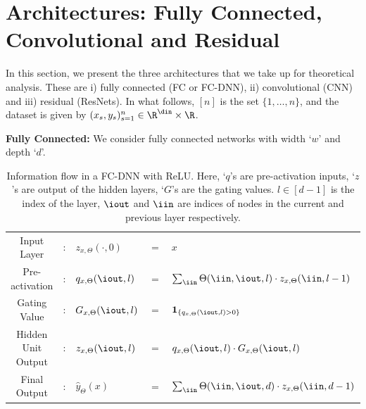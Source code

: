 \section{Architectures: Fully Connected, Convolutional and Residual}\label{sec:arch}
In this section, we present the three architectures that we take up for theoretical analysis. These are i) fully connected (FC or FC-DNN), ii) convolutional (CNN) and iii) residual (ResNets). In what follows, $[n]$ is the set $\{1,\ldots,n\}$, and the dataset is given by $(x_s,y_s)_{s=1}^n\in\R^{\din}\times \R$.

\textbf{Fully Connected:} We consider fully connected networks with width `$w$' and depth `$d$'.
 \FloatBarrier
\begin{table}[h]
\centering
\begin{tabular}{|c l lll|}\hline
Input Layer&: &$z_{x,\Theta}(\cdot,0)$ &$=$ &$x$ \\
Pre-activation&: & $q_{x,\Theta}(\iout,l)$& $=$ & $\sum_{\iin}\Theta(\iin,\iout,l) \cdot z_{x,\Theta}(\iin,l-1) $\\
Gating Value&: &$G_{x,\Theta}(\iout,l)$& $=$ & $\mathbf{1}_{\{q_{x,\Theta}(\iout,l)>0\}}$\\
Hidden Unit Output&: &$z_{x,\Theta}(\iout,l)$ & $=$ & $q_{x,\Theta}(\iout,l)\cdot G_{x,\Theta}(\iout,l)$\\
Final Output&: & $\hat{y}_{\Theta}(x)$ & $=$ & $\sum_{\iin}\Theta(\iin,\iout, d)\cdot z_{x,\Theta}(\iin,d-1)$\\\hline
\end{tabular}
\caption{\small{Information flow in a FC-DNN with ReLU. Here, `$q$'s are pre-activation inputs, `$z$'s are output of the hidden layers, `$G$'s are the gating values. $l\in[d-1]$ is the index of the layer, $\iout$ and $\iin$ are indices of  nodes in the current and previous layer respectively.}}
\label{tb:basic}
\end{table}


